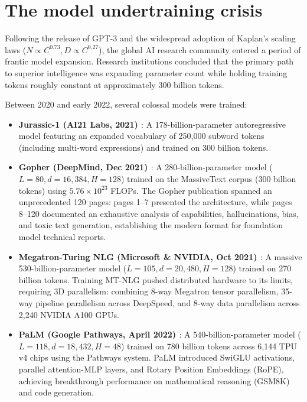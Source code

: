 \documentclass[../../main.tex]{subfiles}
\begin{document}
\clearpage
\section{The model undertraining crisis}
\label{sec:undertraining_dilemma}

Following the release of GPT-3 and the widespread adoption of Kaplan's scaling laws ($N \propto C^{0.73}, D \propto C^{0.27}$), the global AI research community entered a period of frantic model expansion. Research institutions concluded that the primary path to superior intelligence was expanding parameter count while holding training tokens roughly constant at approximately 300 billion tokens.

Between 2020 and early 2022, several colossal models were trained:
\begin{itemize}
    \item \textbf{Jurassic-1 (AI21 Labs, 2021) \cite{lieber2021jurassic}}:
    A 178-billion-parameter autoregressive model featuring an expanded vocabulary of 250,000 subword tokens (including multi-word expressions) and trained on 300 billion tokens.
    \item \textbf{Gopher (DeepMind, Dec 2021) \cite{rae2021gopher}}:
    A 280-billion-parameter model ($L = 80, d = 16,384, H = 128$) trained on the MassiveText corpus (300 billion tokens) using $5.76 \times 10^{23}$ FLOPs. The Gopher publication spanned an unprecedented 120 pages: pages 1--7 presented the architecture, while pages 8--120 documented an exhaustive analysis of capabilities, hallucinations, bias, and toxic text generation, establishing the modern format for foundation model technical reports.
    \item \textbf{Megatron-Turing NLG (Microsoft \& NVIDIA, Oct 2021) \cite{smith2022mtnlg}}:
    A massive 530-billion-parameter model ($L = 105, d = 20,480, H = 128$) trained on 270 billion tokens. Training MT-NLG pushed distributed hardware to its limits, requiring 3D parallelism: combining 8-way Megatron tensor parallelism, 35-way pipeline parallelism across DeepSpeed, and 8-way data parallelism across 2,240 NVIDIA A100 GPUs.
    \item \textbf{PaLM (Google Pathways, April 2022) \cite{chowdhery2023palm}}:
    A 540-billion-parameter model ($L = 118, d = 18,432, H = 48$) trained on 780 billion tokens across 6,144 TPU v4 chips using the Pathways system. PaLM introduced SwiGLU activations, parallel attention-MLP layers, and Rotary Position Embeddings (RoPE), achieving breakthrough performance on mathematical reasoning (GSM8K) and code generation.
\end{itemize}
\end{document}
